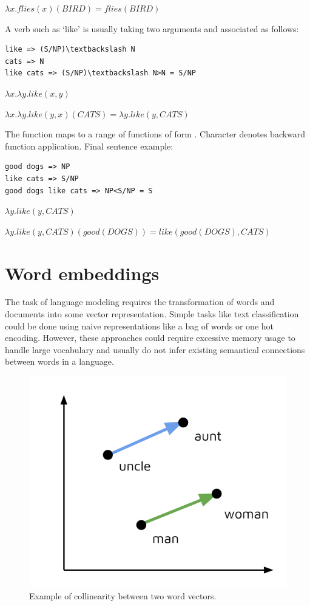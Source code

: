 $\lambda x.flies(x)(BIRD)=flies(BIRD) $

A verb such as ‘like’ is usually taking two arguments and associated as follows:

\begin{verbatim}
like => (S/NP)\textbackslash N
cats => N
like cats => (S/NP)\textbackslash N>N = S/NP
\end{verbatim}

$\lambda x.\lambda y.like(x, y)$

$\lambda x.\lambda y.like(y, x)(CATS)=\lambda y.like(y, CATS)$

The function  maps  to a range of functions of form .  Character \code{<} denotes backward function application. Final sentence example:

\begin{verbatim}
good dogs => NP
like cats => S/NP
good dogs like cats => NP<S/NP = S
\end{verbatim}

$\lambda y.like(y, CATS)$

$\lambda y.like(y, CATS)(good(DOGS))=like(good(DOGS), CATS)$

\section{Word embeddings}
The task of language modeling requires the transformation of words and documents into some vector representation. Simple tasks like text classification could be done using naive representations like a bag of words or one hot encoding. However, these approaches could require excessive memory usage to handle large vocabulary and usually do not infer existing semantical connections between words in a language. 

\begin{figure}
\centering
\includegraphics{Figures/word_embeddings}
\decoRule
\caption[Word vectors]{Example of collinearity between two word vectors.}
\label{fig:word_embeddings}
\end{figure}

